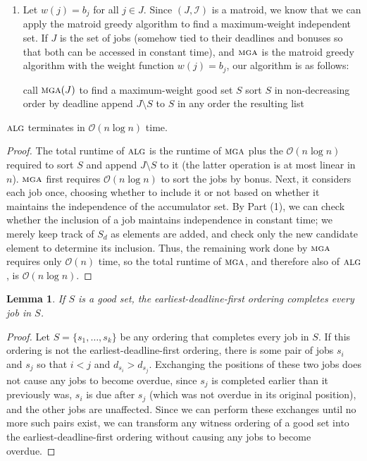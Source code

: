 \documentclass[11pt]{article}
\newcommand{\I}{\mathcal{I}}
\renewcommand{\O}{\mathcal{O}}
\newcommand{\alg}{\textsc{alg}}
\newtheorem{lemma}[theorem]{Lemma}
\begin{document}
\begin{enumerate}[\indent (1)]
    \item Let $w(j) = b_j$ for all $j \in J$.
    Since $(J, \I)$ is a matroid, we know that we can apply the matroid greedy algorithm to find a maximum-weight independent set.
    If $J$ is the set of jobs (somehow tied to their deadlines and bonuses so that both can be accessed in constant time), and $\textsc{mga}$ is the matroid greedy algorithm with the weight function $w(j) = b_j$, our algorithm is as follows:
    \begin{algorithm}
      \begin{algorithmic}
          \State call $\textsc{mga}(J)$ to find a maximum-weight good set $S$
          \State sort $S$ in non-decreasing order by deadline
          \State append $J \setminus S$ to $S$ in any order
          \State \Return the resulting list
        \EndFunction
      \end{algorithmic}
    \end{algorithm}
\end{enumerate}

 $\alg$ terminates in $\O(n \log n)$ time.
\begin{proof}
  The total runtime of $\alg$ is the runtime of $\textsc{mga}$ plus the $\O(n \log n)$ required to sort $S$ and append $J \setminus S$ to it (the latter operation is at most linear in $n$).
  $\textsc{mga}$ first requires $\O(n \log n)$ to sort the jobs by bonus.
  Next, it considers each job once, choosing whether to include it or not based on whether it maintains the independence of the accumulator set.
  By Part (1), we can check whether the inclusion of a job maintains independence in constant time; we merely keep track of $S_d$ as elements are added, and check only the new candidate element to determine its inclusion.
  Thus, the remaining work done by $\textsc{mga}$ requires only $\O(n)$ time, so the total runtime of $\textsc{mga}$, and therefore also of $\alg$, is $\O(n \log n)$.
\end{proof}

\begin{lemma}\label{lem:earliest}
  If $S$ is a good set, the earliest-deadline-first ordering completes every job in $S$.
\end{lemma}

\begin{proof}
  Let $S = \{s_1, \dots, s_k\}$ be any ordering that completes every job in $S$.
  If this ordering is not the earliest-deadline-first ordering, there is some pair of jobs $s_i$ and $s_j$ so that $i < j$ and $d_{s_i} > d_{s_j}$.
  Exchanging the positions of these two jobs does not cause any jobs to become overdue, since $s_j$ is completed earlier than it previously was, $s_i$ is due after $s_j$ (which was not overdue in its original position), and the other jobs are unaffected.
  Since we can perform these exchanges until no more such pairs exist, we can transform any witness ordering of a good set into the earliest-deadline-first ordering without causing any jobs to become overdue.
\end{proof}
\end{document}
